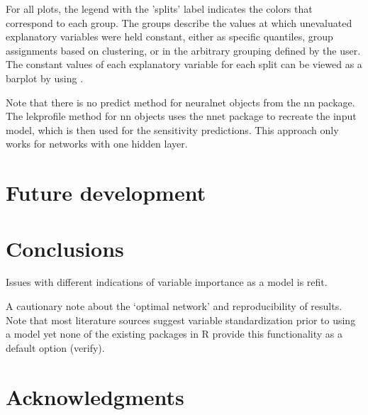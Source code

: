 \documentclass[article,shortnames]{jss}\usepackage[]{graphicx}\usepackage[]{color}
\begin{document}
For all plots, the legend with the 'splits' label indicates the colors that correspond to each group. The groups describe the values at which unevaluated explanatory variables were held constant, either as specific quantiles, group assignments based on clustering, or in the arbitrary grouping defined by the user. The constant values of each explanatory variable for each split can be viewed as a barplot by using .

Note that there is no predict method for neuralnet objects from the nn package. The lekprofile method for nn objects uses the nnet package to recreate the input model, which is then used for the sensitivity predictions. This approach only works for networks with one hidden layer.

\section[Future development]{Future development}


\section[Conclusions]{Conclusions}
Issues with different indications of variable importance as a model is refit.

A cautionary note about the `optimal network' and reproducibility of results.  Note that most literature sources suggest variable standardization prior to using a model yet none of the existing packages in R provide this functionality as a default option (verify).    

\section[Acknowledgments]{Acknowledgments}



\end{document}
